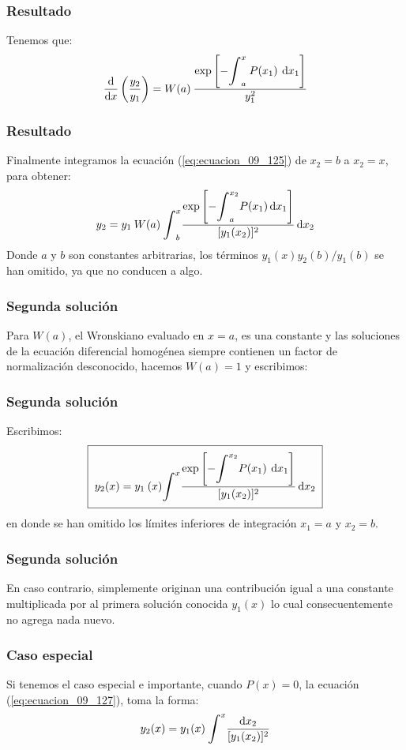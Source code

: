 \documentclass[12pt]{beamer}
\begin{document}
\begin{frame}
\frametitle{Resultado}
Tenemos que:
\pause
\begin{align}
\dv{x} \left( \dfrac{y_{2}}{y_{1}} \right) =  W(a) \: \dfrac{\exp \left[\displaystyle - \scaleint{6ex}_{a}^{x} \: P (x_{1}) \: \dd{x_{1}} \right]}{y^{2}_{1}}
\label{eq:ecuacion_09_125}
\end{align}
\end{frame}
\begin{frame}
\frametitle{Resultado}
Finalmente integramos la ecuación (\ref{eq:ecuacion_09_125}) de $x_{2} = b$ a $x_{2} = x$, para obtener:
\pause
\begin{align}
y_{2} = y_{1} \: W(a) \: \scaleint{6ex}_{b}^{x} \dfrac{\exp \left[ \displaystyle - \scaleint{6ex}_{a}^{x_{2}} P(x_{1}) \dd{x_{1}} \right]}{[y_{1} (x_{2})]^{2}} \dd{x_{2}}
\label{eq:ecuacion_09_126}
\end{align}
Donde $a$ y $b$ son constantes arbitrarias, los términos $y_{1}(x)y_{2}(b)/y_{1}(b)$ se han omitido, ya que no conducen a algo.
\end{frame}
\begin{frame}
\frametitle{Segunda solución}
Para $W (a)$, el Wronskiano evaluado en $x = a$, es una constante y las soluciones de la ecuación diferencial homogénea siempre contienen un factor de normalización desconocido, hacemos $W (a) = 1$ y escribimos:
\end{frame}
\begin{frame}
\frametitle{Segunda solución}
Escribimos:
\pause
\begin{align}
\setlength{\fboxsep}{2\fboxsep}\boxed{y_{2}(x) =  y_{1} \: (x) \scaleint{6ex}^{x} \dfrac{\exp \left[ \displaystyle - \scaleint{6ex}^{x_{2}} P (x_{1}) \: \dd{x_{1}} \right]}{[y_{1}(x_{2})]^{2}} \dd{x_{2}}}
\label{eq:ecuacion_09_127}
\end{align}
en donde se han omitido los límites inferiores de integración $x_{1} = a$ y $x_{2} = b$.
\end{frame}
\begin{frame}
\frametitle{Segunda solución}
En caso contrario, simplemente originan una contribución igual a una constante multiplicada por al primera solución conocida $y_{1} (x)$ lo cual consecuentemente no agrega nada nuevo.
\end{frame}
\begin{frame}
\frametitle{Caso especial}
Si tenemos el caso especial e importante, cuando $P (x) = 0$, la ecuación (\ref{eq:ecuacion_09_127}), toma la forma:
\pause
\begin{align}
y_{2} (x) =  y_{1} (x) \: \scaleint{6ex}^{x} \dfrac{\dd{x_{2}}}{[y_{1}(x_{2})]^{2}}
\label{eq:ecuacion_09_128}
\end{align}
\end{frame}
\end{document}
